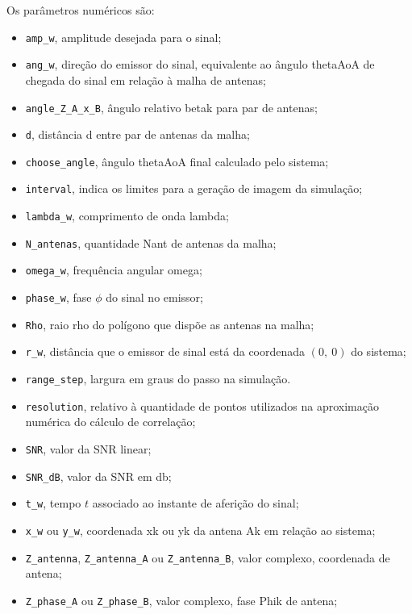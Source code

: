 Os parâmetros numéricos são:
\begin{itemize}
	\item \lstinline|amp_w|, amplitude desejada para o sinal;
	\item \lstinline|ang_w|, direção do emissor do sinal, equivalente ao ângulo \ac{thetaAoA} de chegada do sinal em relação à malha de antenas;
	\item \lstinline|angle_Z_A_x_B|, ângulo relativo \ac{betak} para par de antenas;
	\item \lstinline|d|, distância \ac{d} entre par de antenas da malha;
	\item \lstinline|choose_angle|, ângulo \ac{thetaAoA} final calculado pelo sistema;
	\item \lstinline|interval|, indica os limites para a geração de imagem da simulação;
	\item \lstinline|lambda_w|, comprimento de onda \ac{lambda};
	\item \lstinline|N_antenas|, quantidade \ac{Nant} de antenas da malha;
	\item \lstinline|omega_w|, frequência angular \ac{omega};
	\item \lstinline|phase_w|, fase $\phi$ do sinal no emissor;
	\item \lstinline|Rho|, raio \ac{rho} do polígono que dispõe as antenas na malha;
	\item \lstinline|r_w|, distância que o emissor de sinal está da coordenada $(0,~0)$ do sistema;
	\item \lstinline|range_step|, largura em graus do passo na simulação.
	\item \lstinline|resolution|, relativo à quantidade de pontos utilizados na aproximação numérica do cálculo de correlação;
	\item \lstinline|SNR|, valor da \ac{SNR} linear;
	\item \lstinline|SNR_dB|, valor da \ac{SNR} em \si{\decibel};
	\item \lstinline|t_w|, tempo $t$ associado ao instante de aferição do sinal;
	\item \lstinline|x_w| ou \lstinline|y_w|, coordenada \ac{xk} ou \ac{yk} da antena \ac{Ak} em relação ao sistema;
	\item \lstinline|Z_antenna|, \lstinline|Z_antenna_A| ou \lstinline|Z_antenna_B|, valor complexo, coordenada de antena;
	\item \lstinline|Z_phase_A| ou \lstinline|Z_phase_B|, valor complexo, fase \ac{Phik} de antena;
\end{itemize}


